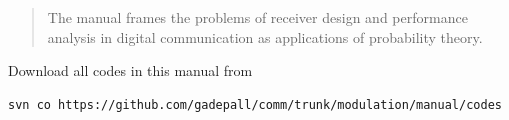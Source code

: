 \documentclass[journal,12pt,twocolumn]{IEEEtran}
\begin{document}
%

\begin{abstract}
The manual frames the problems of receiver design and performance analysis in digital communication as applications of probability theory.

\end{abstract}




%
\IEEEpeerreviewmaketitle

Download all codes in this manual from 
\begin{lstlisting}
svn co https://github.com/gadepall/comm/trunk/modulation/manual/codes
\end{lstlisting}

\renewcommand{\theequation}{\theenumi}
\end{document}
